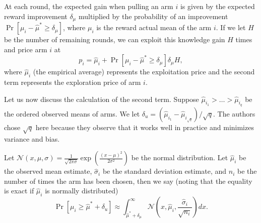 \documentclass[12pt]{article}
\begin{document}
At each round, the expected gain when pulling an arm $i$ is given by the expected reward improvement $\delta_{\mu}$ multiplied by the probability of an
improvement $\Pr[\mu_i - \hat{\mu}^{*} \ge \delta_{\mu}]$, where $\mu_i$ is the reward actual mean of the arm $i$.  If we let $H$ be the number of remaining rounds, 
we can exploit this knowledge gain $H$ times and price arm $i$ at
$$
p_i = \hat{\mu}_i + \Pr[\mu_i - \hat{\mu}^{*} \ge \delta_{\mu}] \delta_{\mu} H,
$$
where $\hat{\mu}_i$ (the empirical average) represents the exploitation price and the second term represents the exploration price of arm $i$. 

Let us now discuss the calculation of the second term.  Suppose $\hat{\mu}_{i_1} > \ldots > \hat{\mu}_{i_q}$ be the ordered observed means of arms.  
We let $\delta_u = \left(\hat{\mu}_{i_1} - \hat{\mu}_{i_{\sqrt{q}}} \right)/\sqrt{q}$.  The authors chose $\sqrt{q}$ here because they observe that it works well
in practice and minimizes variance and bias.

Let $\mathcal{N}(x, \mu, \sigma) = \frac{1}{\sqrt{2 \pi \sigma}} \exp \left(\frac{(x - \mu)^2}{2 \sigma^2} \right)$ be the normal distribution.  
Let $\hat{\mu}_i$ be the observed mean estimate, $\hat{\sigma}_i$ be the standard deviation estimate, and $n_i$ be the number of times the arm has been chosen, then
we say (noting that the equality is exact if $\hat{\mu}_{i}$ is normally distributed)
$$
\Pr[\mu_i \ge \hat{\mu}^{*} + \delta_u] \approx \int_{\hat{\mu}^{*} + \delta_{\mu}}^{\infty} \mathcal{N}\left(x, \hat{\mu}_{i}, \frac{\hat{\sigma}_i}{\sqrt{n_i}} \right) dx.
$$
\end{document}
